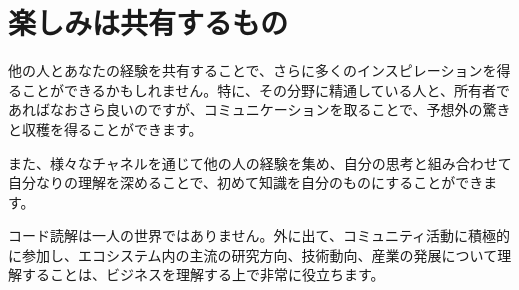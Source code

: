 \section{楽しみは共有するもの}

\begin{content}

他の人とあなたの経験を共有することで、さらに多くのインスピレーションを得ることができるかもしれません。特に、その分野に精通している人と、所有者であればなおさら良いのですが、コミュニケーションを取ることで、予想外の驚きと収穫を得ることができます。

また、様々なチャネルを通じて他の人の経験を集め、自分の思考と組み合わせて自分なりの理解を深めることで、初めて知識を自分のものにすることができます。

コード読解は一人の世界ではありません。外に出て、コミュニティ活動に積極的に参加し、エコシステム内の主流の研究方向、技術動向、産業の発展について理解することは、ビジネスを理解する上で非常に役立ちます。

\end{content}
